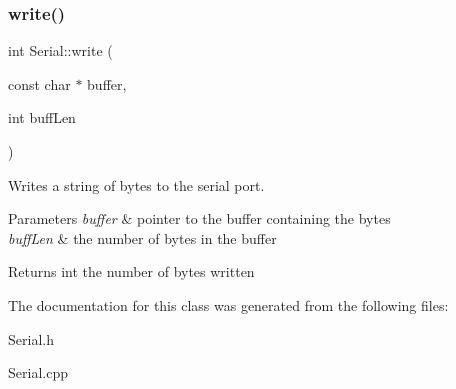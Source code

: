 \subsubsection{\texorpdfstring{write()}{write()}}
{\footnotesize\ttfamily int Serial\+::write (\begin{DoxyParamCaption}\item[{const char $\ast$}]{buffer,  }\item[{int}]{buff\+Len }\end{DoxyParamCaption})}

Writes a string of bytes to the serial port.


\begin{DoxyParams}{Parameters}
{\em buffer} & pointer to the buffer containing the bytes \\
\hline
{\em buff\+Len} & the number of bytes in the buffer\\
\hline
\end{DoxyParams}
\begin{DoxyReturn}{Returns}
int the number of bytes written 
\end{DoxyReturn}


The documentation for this class was generated from the following files\+:\begin{DoxyCompactItemize}
\item 
Serial.\+h\item 
Serial.\+cpp\end{DoxyCompactItemize}
